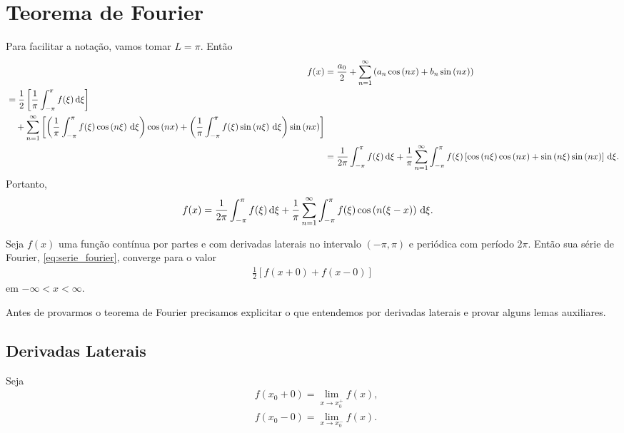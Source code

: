 \section{Teorema de Fourier}
Para facilitar a nota\c{c}\~{a}o, vamos tomar $L = \pi$. Ent\~{a}o
\begin{align*}
    f(x) &= \frac{a_0}{2} + \sum_{n = 1}^\infty \left( a_n \cos\left( n x \right) + b_n \sin\left( n x \right) \right) \\
    \begin{split}
        &= \frac{1}{2} \left[ \frac{1}{\pi} \int_{-\pi}^\pi f(\xi) \, \mathrm{d}\xi \right] \\ &\quad {}+ \sum_{n = 1}^\infty \left[ \left( \frac{1}{\pi} \int_{-\pi}^\pi f(\xi) \cos\left( n \xi \right) \, \mathrm{d}\xi \right) \cos\left( n x \right) + \left( \frac{1}{\pi} \int_{-\pi}^\pi f(\xi) \sin\left( n \xi \right) \, \mathrm{d}\xi \right) \sin\left( n x \right) \right]
    \end{split} \\
    &= \frac{1}{2\pi} \int_{-\pi}^\pi f(\xi) \, \mathrm{d}\xi + \frac{1}{\pi} \sum_{n = 1}^\infty \int_{-\pi}^\pi f(\xi) \left[ \cos\left( n \xi \right) \cos\left( n x \right) + \sin\left( n \xi \right) \sin\left( n x \right) \right] \, \mathrm{d}\xi.
\end{align*}
Portanto,
\begin{align}
    f(x) &= \frac{1}{2\pi} \int_{-\pi}^\pi f(\xi) \, \mathrm{d}\xi + \frac{1}{\pi} \sum_{n = 1}^\infty \int_{-\pi}^\pi f(\xi) \cos\left( n (\xi - x) \right) \, \mathrm{d}\xi.
    \label{eq:serie_fourier}
\end{align}

\begin{teo}[Fourier]
    Seja $f(x)$ uma fun\c{c}\~{a}o cont\'{i}nua por partes e com derivadas laterais no intervalo $(-\pi, \pi)$ e peri\'{o}dica com per\'{i}odo $2\pi$. Ent\~{a}o sua s\'{e}rie de Fourier, \eqref{eq:serie_fourier}, converge para o valor
    \begin{align*}
        \frac{1}{2} \left[ f(x + 0) + f(x - 0) \right]
    \end{align*}
    em $-\infty < x < \infty$.
\end{teo}

Antes de provarmos o teorema de Fourier precisamos explicitar o que entendemos por derivadas laterais e provar alguns lemas auxiliares.

\subsection{Derivadas Laterais}
Seja
\begin{align*}
    & f(x_0 + 0) = \lim_{x \to x_0^+} f(x), \\
    & f(x_0 - 0) = \lim_{x \to x_0^-} f(x).
\end{align*}

